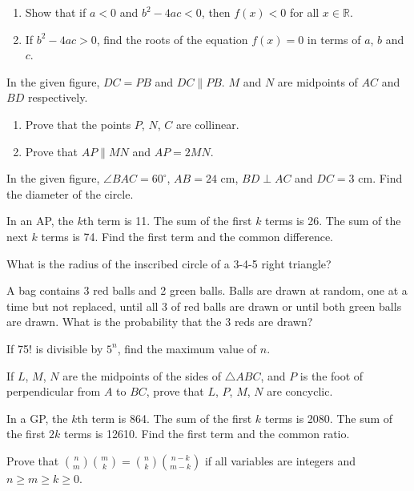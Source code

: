 \begin{problems}
\begin{enumerate}
        \item Show that if $a < 0$ and $b^2 - 4ac < 0$, then $f(x) < 0$ for all
            $x \in \mathbb{R}$.
        
        \item If $b^2 - 4ac > 0$, find the roots of the equation $f(x) = 0$ in
            terms of $a$, $b$ and $c$. 
    \end{enumerate}
    
    \problem In the given figure, $DC = PB$ and $DC \parallel PB$. $M$ and $N$
    are midpoints of $AC$ and $BD$ respectively. 
    \begin{enumerate}
        \item Prove that the points $P$, $N$, $C$ are collinear. 
        
        \item Prove that $AP \parallel MN$ and $AP = 2MN$. 
    \end{enumerate}
    
    \problem In the given figure, $\angle BAC = 60^\circ$, $AB = 24$ cm, $BD
    \perp AC$ and $DC = 3$ cm. Find the diameter of the circle. 
    
    \problem In an AP, the $k$th term is 11. The sum of the first $k$ terms is
    26. The sum of the next $k$ terms is 74. Find the first term and the common
    difference. 
    
    \problem What is the radius of the inscribed circle of a 3-4-5 right
    triangle? 
    
    \problem A bag contains 3 red balls and 2 green balls. Balls are drawn at
    random, one at a time but not replaced, until all 3 of red balls are drawn
    or until both green balls are drawn. What is the probability that the 3
    reds are drawn? 
    
    \problem If 75! is divisible by $5^n$, find the maximum value of $n$. 
    
    \problem If $L$, $M$, $N$ are the midpoints of the sides of $\triangle
    ABC$, and $P$ is the foot of perpendicular from $A$ to $BC$, prove that
    $L$, $P$, $M$, $N$ are concyclic.
    
    \problem In a GP, the $k$th term is 864. The sum of the first $k$ terms is
    2080. The sum of the first $2k$ terms is 12610. Find the first term and the
    common ratio.
    
    \problem Prove that $\binom{n}{m}\binom{m}{k} = \binom{n}{k}\binom{n - k}{m
    - k}$ if all variables are integers and $n \geq m \geq k \geq 0$.
    

\end{problems}

